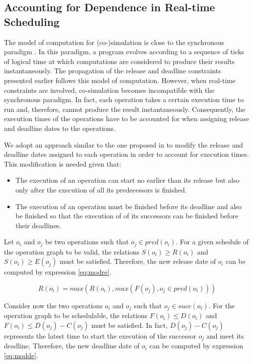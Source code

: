 \subsection{Accounting for Dependence in Real-time Scheduling}

The model of computation for (co-)simulation is close to the synchronous paradigm \cite{benveniste:1991synchronous,benveniste:2003}. In this paradigm, a program evolves according to a sequence of ticks of logical time at which computations are considered to produce their results instantaneously. The propagation of the release and deadline constraints presented earlier follows this model of computation. However, when real-time constraints are involved, co-simulation becomes incompatible with the synchronous paradigm. In fact, each operation takes a certain execution time to run and, therefore, cannot produce the result instantaneously. Consequently, the execution times of the operations have to be accounted for when assigning release and deadline dates to the operations.

We adopt an approach similar to the one proposed in \cite{chetto:1990} to modify the release and deadline dates assigned to each operation in order to account for execution times. This modification is needed given that:

\begin{itemize}

\item The execution of an operation can start no earlier than its release but also only after the execution of all its predecessors is finished.

\item The execution of an operation must be finished before its deadline and also be finished so that the execution of of its successors can be finished before their deadlines.

\end{itemize}

Let $o_i$ and $o_j$ be two operations such that $o_j \in pred(o_i)$. For a given schedule of the operation graph to be valid, the relations $S(o_i) \geq R(o_i)$ and $S(o_i) \geq E(o_j)$ must be satisfied. Therefore, the new release date of $o_i$ can be computed by expression \ref{eq:modre}.

\begin{equation} 
R(o_i) = max(R(o_i), max(F(o_j), o_j \in pred(o_i)))
\label{eq:modre}
\end{equation}

Consider now the two operations $o_i$ and $o_j$ such that $o_j \in succ(o_i)$. For the operation graph to be schedulable, the relations $F(o_i) \leq D(o_i)$ and $F(o_i) \leq D(o_j) - C(o_j)$ must be satisfied. In fact, $D(o_j) - C(o_j)$ represents the latest time to start the execution of the successor $o_j$ and meet its deadline. Therefore, the new deadline date of $o_i$ can be computed by expression \ref{eq:modde}.

